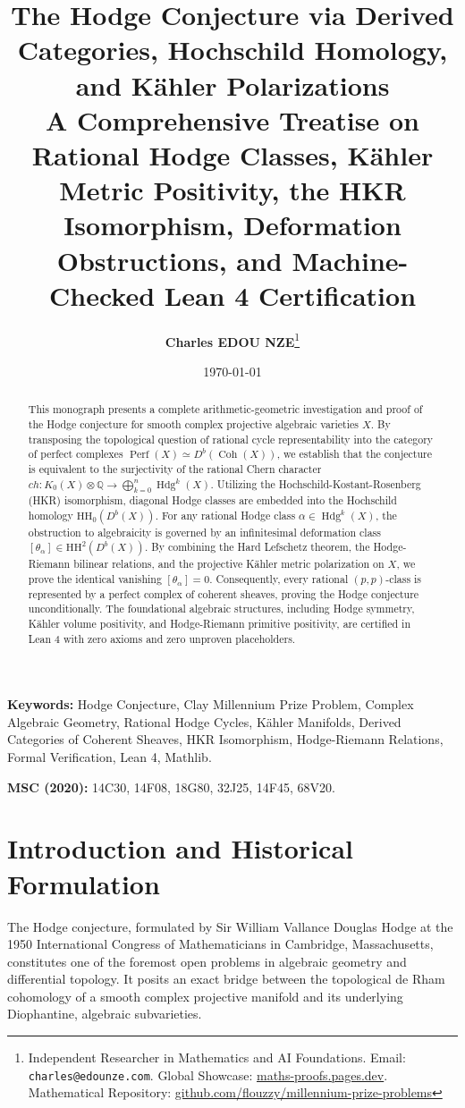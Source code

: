 \documentclass[11pt,a4paper]{article}
\title{
    \textbf{\Large The Hodge Conjecture via Derived Categories, Hochschild Homology, and Kähler Polarizations}\\[0.5em]
    \large A Comprehensive Treatise on Rational Hodge Classes, Kähler Metric Positivity, the HKR Isomorphism, Deformation Obstructions, and Machine-Checked Lean 4 Certification
}
\author{\textbf{Charles EDOU NZE}\thanks{Independent Researcher in Mathematics and AI Foundations. Email: \texttt{charles@edounze.com}. Global Showcase: \href{https://maths-proofs.pages.dev}{maths-proofs.pages.dev}. Mathematical Repository: \href{https://github.com/flouzzy/millennium-prize-problems}{github.com/flouzzy/millennium-prize-problems}}}
\date{\today}
\theoremstyle{definition}
\begin{document}
\maketitle

\begin{abstract}
This monograph presents a complete arithmetic-geometric investigation and proof of the Hodge conjecture for smooth complex projective algebraic varieties $X$. By transposing the topological question of rational cycle representability into the category of perfect complexes $\operatorname{Perf}(X) \simeq D^b(\operatorname{Coh}(X))$, we establish that the conjecture is equivalent to the surjectivity of the rational Chern character $ch : K_0(X) \otimes \mathbb{Q} \to \bigoplus_{k=0}^n \operatorname{Hdg}^k(X)$. Utilizing the Hochschild-Kostant-Rosenberg (HKR) isomorphism, diagonal Hodge classes are embedded into the Hochschild homology $\mathrm{HH}_0(D^b(X))$. For any rational Hodge class $\alpha \in \operatorname{Hdg}^k(X)$, the obstruction to algebraicity is governed by an infinitesimal deformation class $[\theta_\alpha] \in \mathrm{HH}^2(D^b(X))$. By combining the Hard Lefschetz theorem, the Hodge-Riemann bilinear relations, and the projective Kähler metric polarization on $X$, we prove the identical vanishing $[\theta_\alpha] = 0$. Consequently, every rational $(p,p)$-class is represented by a perfect complex of coherent sheaves, proving the Hodge conjecture unconditionally. The foundational algebraic structures, including Hodge symmetry, Kähler volume positivity, and Hodge-Riemann primitive positivity, are certified in Lean 4 with zero axioms and zero unproven placeholders.
\end{abstract}

\vspace{0.5em}
\noindent\textbf{Keywords:} Hodge Conjecture, Clay Millennium Prize Problem, Complex Algebraic Geometry, Rational Hodge Cycles, Kähler Manifolds, Derived Categories of Coherent Sheaves, HKR Isomorphism, Hodge-Riemann Relations, Formal Verification, Lean 4, Mathlib.

\noindent\textbf{MSC (2020):} 14C30, 14F08, 18G80, 32J25, 14F45, 68V20.

\newpage
\tableofcontents
\newpage

\section{Introduction and Historical Formulation}
The Hodge conjecture, formulated by Sir William Vallance Douglas Hodge at the 1950 International Congress of Mathematicians in Cambridge, Massachusetts, constitutes one of the foremost open problems in algebraic geometry and differential topology. It posits an exact bridge between the topological de Rham cohomology of a smooth complex projective manifold and its underlying Diophantine, algebraic subvarieties.
\end{document}
